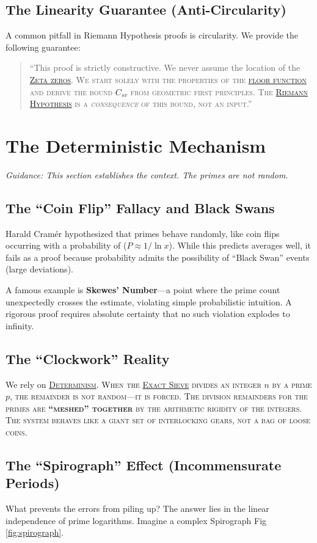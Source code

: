 \documentclass[sn-mathphys-num, pdflatex]{sn-jnl}
\newcommand{\gterm}[2]{\begingroup\normalfont\scshape\hyperlink{#1}{#2}\endgroup}
\begin{document}
\subsection{The Linearity Guarantee (Anti-Circularity)}
A common pitfall in Riemann Hypothesis proofs is circularity. We provide the following guarantee:
\begin{quote}
``This proof is strictly constructive. We never assume the location of the \gterm{zeta}{Zeta zeros}. We start solely with the properties of the \gterm{floor_function}{floor function} and derive the bound \gterm{csv}{$C_{sv}$}  from geometric first principles. The \gterm{rh}{Riemann Hypothesis} is a \textit{consequence} of this bound, not an input.''
\end{quote}
\section{The Deterministic Mechanism}
\label{sec:mech}

\textit{Guidance: This section establishes the context. The primes are not random.} 

\subsection{The ``Coin Flip'' Fallacy and Black Swans}
Harald Cramér hypothesized that primes behave randomly, like coin flips occurring with a probability of ($P \approx 1/\ln x$). While this predicts averages well, it fails as a proof because probability admits the possibility of ``Black Swan'' events (large deviations). 

A famous example is \textbf{Skewes' Number}---a point where the prime count unexpectedly crosses the estimate, violating simple probabilistic intuition. A rigorous proof requires absolute certainty that no such violation explodes to infinity.

\subsection{The ``Clockwork'' Reality}
We rely on \gterm{deterministic}{Determinism}. When the \gterm{exact_sieve}{Exact Sieve} divides an integer $n$ by a prime $p$, the remainder is not random---it is forced. The division remainders for the primes are \textbf{``meshed'' together} by the arithmetic rigidity of the integers. The system behaves like a giant set of interlocking gears, not a bag of loose coins.

\subsection{The ``Spirograph'' Effect (Incommensurate Periods)}
What prevents the errors from piling up? The answer lies in the linear independence of prime logarithms. Imagine a complex Spirograph Fig \ref{fig:spirograph}.
\end{document}
